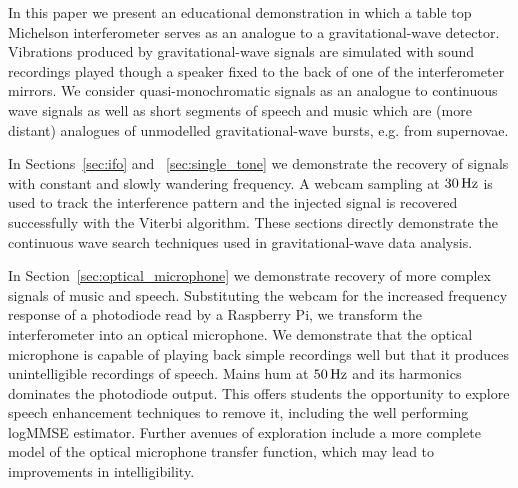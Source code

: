 \documentclass[paper-main.tex]{subfiles}
\begin{document}

In this paper we present an educational demonstration in which a table top Michelson interferometer serves as an analogue to a gravitational-wave detector. 
Vibrations produced by gravitational-wave signals are simulated with sound recordings played though a speaker fixed to the back of one of the interferometer mirrors. 
We consider quasi-monochromatic signals as an analogue to continuous wave signals as well as short segments of speech and music which are (more distant) analogues of unmodelled gravitational-wave bursts, e.g. from supernovae. 


In Sections~\ref{sec:ifo} and ~\ref{sec:single_tone} we demonstrate the recovery of signals with constant and slowly wandering frequency. 
A webcam sampling at $30\,{\rm Hz}$ is used to track the interference pattern and the injected signal is recovered successfully with the Viterbi algorithm. 
These sections directly demonstrate the continuous wave search techniques used in gravitational-wave data analysis. 


In Section~\ref{sec:optical_microphone} we demonstrate recovery of more complex signals of music and speech. 
Substituting the webcam for the increased frequency response of a photodiode read by a Raspberry Pi, we transform the interferometer into an optical microphone.
We demonstrate that the optical microphone is capable of playing back simple recordings well but that it produces unintelligible recordings of speech. 
Mains hum at $50\,{\rm Hz}$ and its harmonics dominates the photodiode output. 
This offers students the opportunity to explore speech enhancement techniques to remove it, including the well performing logMMSE estimator. 
Further avenues of exploration include a more complete model of the optical microphone transfer function, which may lead to improvements in intelligibility. 
\end{document}
